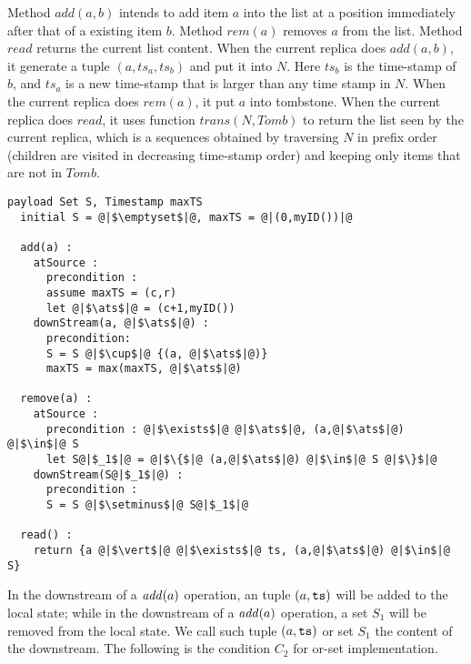 Method $\mathit{add}(a,b)$ intends to add item $a$ into the list at a position immediately after that of a existing item $b$. Method $\mathit{rem}(a)$ removes $a$ from the list. Method $\mathit{read}$ returns the current list content. When the current replica does $\mathit{add}(a,b)$, it generate a tuple $(a,ts_a,ts_b)$ and put it into $N$. Here $ts_b$ is the time-stamp of $b$, and $ts_a$ is a new time-stamp that is larger than any time stamp in $N$. When the current replica does $\mathit{rem}(a)$, it put $a$ into tombstone. When the current replica does $\mathit{read}$, it uses function $\mathit{trans}(N,\mathit{Tomb})$ to return the list seen by the current replica, which is a sequences obtained by traversing $N$ in prefix order (children are visited in decreasing time-stamp order) and keeping only items that are not in $\mathit{Tomb}$.

\begin{lstlisting}[caption={Pseudo-code of the or-set CRDT}, captionpos=b,label={lst:or-set}]
  payload Set S, Timestamp maxTS
  initial S = @|$\emptyset$|@, maxTS = @|(0,myID())|@

  add(a) :
    atSource :
      precondition :
      assume maxTS = (c,r)
      let @|$\ats$|@ = (c+1,myID())
    downStream(a, @|$\ats$|@) :
      precondition:
      S = S @|$\cup$|@ {(a, @|$\ats$|@)}
      maxTS = max(maxTS, @|$\ats$|@)

  remove(a) :
    atSource :
      precondition : @|$\exists$|@ @|$\ats$|@, (a,@|$\ats$|@) @|$\in$|@ S
      let S@|$_1$|@ = @|$\{$|@ (a,@|$\ats$|@) @|$\in$|@ S @|$\}$|@
    downStream(S@|$_1$|@) :
      precondition :
      S = S @|$\setminus$|@ S@|$_1$|@

  read() :
    return {a @|$\vert$|@ @|$\exists$|@ ts, (a,@|$\ats$|@) @|$\in$|@ S}
\end{lstlisting}


In the downstream of a $\alabellongNoret[\mathit{add}]{\argv}$ operation, an tuple $(\argv,\ats)$ will be added to the local state; while in the downstream of a $\alabellongNoret[\mathit{add}]{\argv}$ operation, a set $S_1$ will be removed from the local state. We call such tuple $(\argv,\ats)$ or set $S_1$ the content of the downstream. The following is the condition $C_2$ for or-set implementation.

